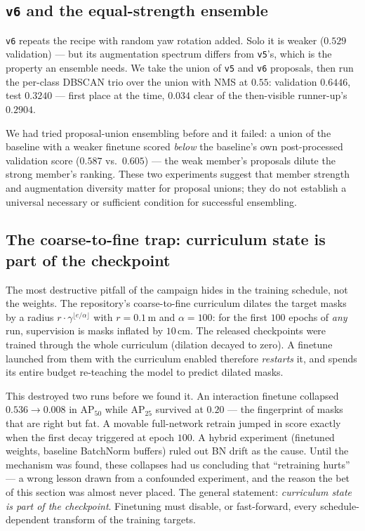\documentclass[11pt]{article}
\newcommand{\apfifty}{AP$_{50}$}
\begin{document}
\subsection{\texttt{v6} and the equal-strength ensemble}

\texttt{v6} repeats the recipe with random yaw rotation added. Solo it is
weaker ($0.529$ validation) --- but its augmentation spectrum differs from
\texttt{v5}'s, which is the property an ensemble needs. We take the union of
\texttt{v5} and \texttt{v6} proposals, then run the per-class DBSCAN trio
over the union with NMS at $0.55$: validation $0.6446$, test
$\mathbf{0.3240}$ --- first place at the time, $0.034$ clear of the
then-visible runner-up's $0.2904$.

We had tried proposal-union ensembling before and it failed: a union of the
baseline with a weaker finetune scored \emph{below} the baseline's own
post-processed validation score ($0.587$ vs.\ $0.605$) --- the weak member's
proposals dilute the strong member's ranking. These two experiments suggest that member strength and augmentation
diversity matter for proposal unions; they do not establish a universal
necessary or sufficient condition for successful ensembling.

\subsection{The coarse-to-fine trap: curriculum state is part of the
checkpoint}
\label{sec:c2f}

The most destructive pitfall of the campaign hides in the training schedule,
not the weights. The repository's coarse-to-fine curriculum dilates the
target masks by a radius $r \cdot \gamma^{\lfloor e/\alpha \rfloor}$ with
$r = 0.1$\,m and $\alpha = 100$: for the first $100$ epochs of \emph{any}
run, supervision is masks inflated by $10$\,cm. The released checkpoints
were trained through the whole curriculum (dilation decayed to zero). A
finetune launched from them with the curriculum enabled therefore
\emph{restarts} it, and spends its entire budget re-teaching the model to
predict dilated masks.

This destroyed two runs before we found it. An interaction finetune
collapsed $0.536 \to 0.008$ in \apfifty{} while AP$_{25}$ survived at $0.20$
--- the fingerprint of masks that are right but fat. A movable full-network
retrain jumped in score exactly when the first decay triggered at epoch
$100$. A hybrid experiment (finetuned weights, baseline BatchNorm buffers)
ruled out BN drift as the cause. Until the mechanism was found, these
collapses had us concluding that ``retraining hurts'' --- a wrong lesson
drawn from a confounded experiment, and the reason the bet of this section
was almost never placed. The general statement: \emph{curriculum state is
part of the checkpoint}. Finetuning must disable, or fast-forward, every
schedule-dependent transform of the training targets.
\end{document}
